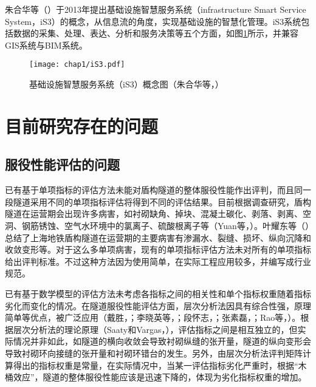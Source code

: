 朱合华等（\citeyear{朱合华2018智慧基础设施}）于2013年提出基础设施智慧服务系统（infrastructure Smart Service System，iS3）的概念，从信息流的角度，实现基础设施的智慧化管理。iS3系统包括数据的采集、处理、表达、分析和服务决策等五个方面，如图\ref{fig:iS3概念图}所示，并兼容GIS系统与BIM系统。

\begin{figure}[!h]
	\centering
	\texttt{[image: chap1/iS3.pdf]}
	\caption{基础设施智慧服务系统（iS3）概念图（朱合华等，\citeyear{朱合华2018智慧基础设施}）}
	\label{fig:iS3概念图}
\end{figure}

\section{目前研究存在的问题}

\subsection{服役性能评估的问题}

已有基于单项指标的评估方法未能对盾构隧道的整体服役性能作出评判，而且同一段隧道采用不同的单项指标评估将得到不同的评估结果。目前根据调查研究，盾构隧道在运营期会出现许多病害，如衬砌缺角、掉块、混凝土碳化、剥落、剥离、空洞、钢筋锈蚀、空气水环境中的氯离子、硫酸根离子等（Yuan等，\citeyear{yuan2013predictive}）。叶耀东等（\citeyear{叶耀东2007软土地铁运营隧道病害现状及成因分析}）总结了上海地铁盾构隧道在运营期的主要病害有渗漏水、裂缝、损坏、纵向沉降和收敛变形等。对于这么多单项病害，现有的单项指标评估方法未对所有的单项指标给出评判标准。不过这种方法因为使用简单，在实际工程应用较多，并编写成行业规范。

已有基于数学模型的评估方法未考虑各指标之间的相关性和单个指标权重随着指标劣化而变化的情况。在隧道服役性能评估方面，层次分析法因具有综合性强，原理简单等优点，被广泛应用（戴胜，\citeyear{戴胜2008越江盾构隧道耐久性分析与评估体系研究}；李晓英等，\citeyear{李晓英2008铁路隧道健康状态模糊评价体系研究}；段怀志，\citeyear{段怀志2009隧道及地下工程健康评估研究}；张素磊，\citeyear{张素磊2012隧道衬砌结构健康诊断及技术状况评定研究}；Rao等，\citeyear{rao2016fuzzy}）。根据层次分析法的理论原理（Saaty和Vargas，\citeyear{saaty2012models}），评估指标之间是相互独立的，但实际情况并非如此，如隧道的横向收敛会导致衬砌纵缝的张开量，隧道的纵向变形会导致衬砌环向接缝的张开量和衬砌环错台的发生。另外，由层次分析法评判矩阵计算得出的指标权重是常量，在实际情况中，当某一评估指标劣化严重时，根据“木桶效应”，隧道的整体服役性能应该是迅速下降的，体现为劣化指标权重的增加。

